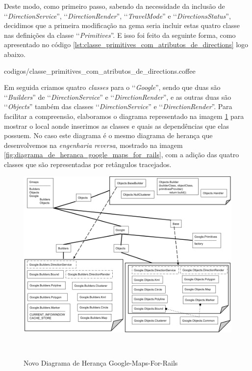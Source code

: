 Deste modo, como primeiro passo, sabendo da necessidade da inclusão de ‘‘\emph{DirectionService}'',
‘‘\emph{DirectionRender}'', ‘‘\emph{TravelMode}'' e ‘‘\emph{DirectionsStatus}'', decidimos que a primeira
modificação na gema seria  incluir estas quatro classe nas definições da classe ‘‘\emph{Primitives}''.
E isso foi feito da seguinte forma, como apresentado no código
\ref{lst:classe_primitives_com_atributos_de_directions} logo abaixo.


{codigos/classe_primitives_com_atributos_de_directions.coffee}

Em seguida criamos quatro \emph{classes} para o ‘‘\emph{Google}'', sendo que duas são ‘‘\emph{Builders}'' de
‘‘\emph{DirectionService}'' e ‘‘\emph{DirectionRender}'', e as outras duas são ‘‘\emph{Objects}'' também das
classes ‘‘\emph{DirectionService}'' e ‘‘\emph{DirectionRender}''. Para facilitar a compreensão, elaboramos o
diagrama representado na imagem \ref{fig:novo_diagrama_de_heranca_google_maps_for_rails} para mostrar o
local aonde inserimos as classes e quais as dependências que elas possuem. No caso este diagrama é o mesmo
diagrama de herança que desenvolvemos na \emph{engenharia reversa}, mostrado na imagem
\ref{fig:diagrama_de_heranca_google_maps_for_rails}, com a adição das quatro classes que são representadas
por retângulos tracejados.

\begin{figure}[ht]
  \begin{center}
    \includegraphics[scale=0.35]{images/novo_diagrama_de_heranca_google_maps_for_rails.png}
    \caption{Novo Diagrama de Herança Google-Maps-For-Rails}
    \label{fig:novo_diagrama_de_heranca_google_maps_for_rails}
  \end{center}  \
\end{figure}

